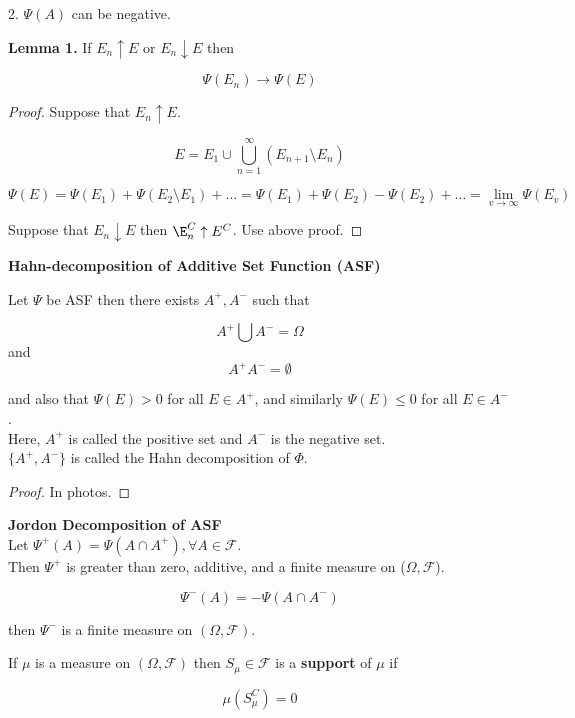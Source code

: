 \documentclass[11pt,fleqn]{book} %
\begin{document}
	2. $\Psi(A)$ can be negative. 


\textbf{Lemma 1. } If $E_n \uparrow E$ or $E_n \downarrow E$ then 

		$$\Psi(E_n) \rightarrow \Psi(E) $$

\begin{proof}
	Suppose  that $E_n \uparrow E$. 

			$$E = E_1 \cup \bigcup_{n=1}^\infty(E_{n+1} \setminus E_n) $$

			$$\Psi(E) = \Psi(E_1) + \Psi(E_2 \setminus E_1) + \dots = \Psi(E_1) + \Psi(E_2) - \Psi(E_2) + \dots = \lim_{v \rightarrow \infty} \Psi(E_v)$$

	Suppose that $E_n \downarrow E$ then $\E_n^C \uparrow E^C$. Use above proof.

\end{proof}

\textbf{Hahn-decomposition of Additive Set Function (ASF)}\\

\begin{theorem}
	Let $\Psi$ be ASF then there exists $A^+, A^-$ such that 

			$$A^+ \bigcup A^- = \Omega $$
	and 
			$$A^+A^- = \emptyset $$

and also that $\Psi(E)> 0$ for all $E \in A^+$, and similarly $\Psi(E) \leq 0$ for all $E \in A^-$.\\

Here, $A^+$ is called the positive set and $A^-$ is the negative set. \\

$\{A^+, A^-\}$ is called the Hahn decomposition of $\Phi$. 
\end{theorem}

\begin{proof}
	In photos. 
\end{proof}

\textbf{Jordon Decomposition of ASF}\\

Let $\Psi^+(A) = \Psi(A \cap A^+), \forall A \in \mathcal{F}$. \\

Then $\Psi^+$ is greater than zero, additive, and a finite measure on ($\Omega, \mathcal{F}$). 

		$$\Psi^-(A) = - \Psi(A \cap A^-) $$ 

then $\Psi^-$ is a finite measure on $(\Omega, \mathcal{F})$. 

\begin{definition}
	If $\mu$ is a measure on $(\Omega, \mathcal{F})$ then $S_\mu \in \mathcal{F}$ is a \textbf{support} of $\mu$ if 

			$$\mu(S_{\mu}^C) = 0 $$
\end{definition}
\end{document}
